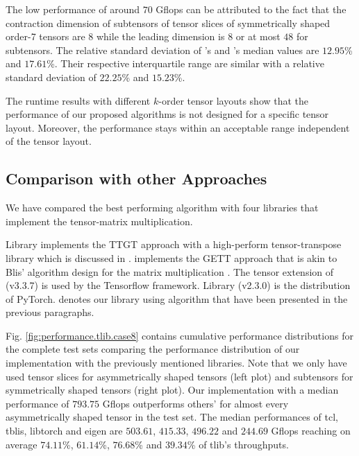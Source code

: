 The low performance of around $70$ Gflops can be attributed to the fact that the contraction dimension of subtensors of tensor slices of symmetrically shaped order-7 tensors are $8$ while the leading dimension is $8$ or at most $48$ for subtensors.
The relative standard deviation of 's and 's median values are $12.95$\% and $17.61$\%.
Their respective interquartile range are similar with a relative standard deviation of $22.25$\% and $15.23$\%.

The runtime results with different $k$-order tensor layouts show that the performance of our proposed algorithms is not designed for a specific tensor layout.
Moreover, the performance stays within an acceptable range independent of the tensor layout.
\vspace{-1em}

\subsection{Comparison with other Approaches}
We have compared the best performing algorithm with four libraries that implement the tensor-matrix multiplication.

Library  implements the TTGT approach with a high-perform tensor-transpose library  which is discussed in \cite{springer:2018:design}.
 implements the GETT approach that is akin to Blis' algorithm design for the matrix multiplication \cite{matthews:2018:high}.
The tensor extension of  (v3.3.7) is used by the Tensorflow framework.
Library  (v2.3.0) is the  distribution of PyTorch.
 denotes our library using algorithm  that have been presented in the previous paragraphs.

Fig. \ref{fig:performance.tlib.case8} contains cumulative performance distributions for the complete test sets comparing the performance distribution of our implementation with the previously mentioned libraries.
Note that we only have used tensor slices for asymmetrically shaped tensors (left plot) and subtensors for symmetrically shaped tensors (right plot).
Our implementation with a median performance of $793.75$ Gflops outperforms others' for almost every asymmetrically shaped tensor in the test set.
The median performances of tcl, tblis, libtorch and eigen are $503.61$, $415.33$, $496.22$ and $244.69$ Gflops reaching on average $74.11$\%, $61.14$\%, $76.68$\% and $39.34$\% of tlib's throughputs.

